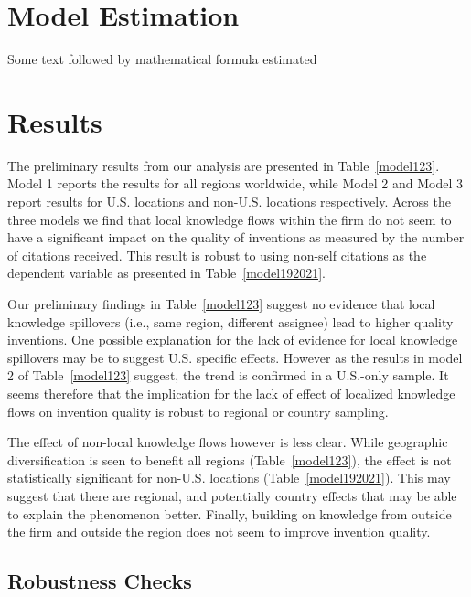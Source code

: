 \documentclass[12pt,letterpaper]{article}
\begin{document}
\section*{Model Estimation}
Some text followed by mathematical formula estimated

\section*{Results}
The preliminary results from our analysis are presented in Table~\ref{model123}. Model 1 reports the results for all regions worldwide, while Model 2 and Model 3 report results for U.S. locations and non-U.S. locations respectively. Across the three models we find that local knowledge flows within the firm do not seem to have a significant impact on the quality of inventions as measured by the number of citations received. This result is robust to using non-self citations as the dependent variable as presented in Table~\ref{model192021}. \par
Our preliminary findings in Table~\ref{model123} suggest no evidence that local knowledge spillovers (i.e., same region, different assignee) lead to higher quality inventions.  One possible explanation for the lack of evidence for local knowledge spillovers may be to suggest U.S. specific effects. However as the results in model 2 of Table~\ref{model123} suggest, the trend is confirmed in a U.S.-only sample. It seems therefore that the implication for the lack of effect of localized knowledge flows on invention quality is robust to regional or country sampling. \par
The effect of non-local knowledge flows however is less clear. While geographic diversification is seen to benefit all regions (Table~\ref{model123}), the effect is not statistically significant for non-U.S. locations (Table~\ref{model192021}). This may suggest that there are regional, and potentially country effects that may be able to explain the phenomenon better. Finally, building on knowledge from outside the firm and outside the region does not seem to improve invention quality.\par
\subsection{Robustness Checks}
\end{document}
